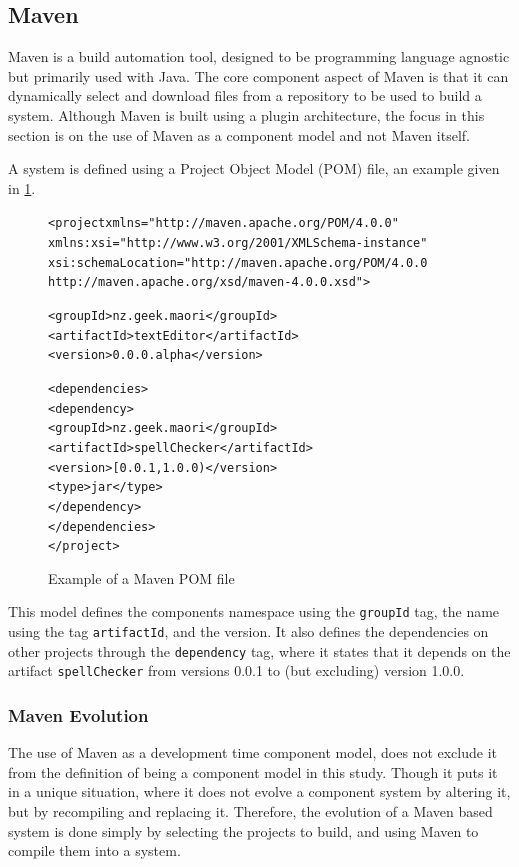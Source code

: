 \subsection{Maven}
Maven is a build automation tool, designed to be programming language agnostic but primarily used with Java.
The core component aspect of Maven is that it can dynamically select and download files from a repository to be used to build a system.
Although Maven is built using a plugin architecture, the focus in this section is on the use of Maven as a component model and not Maven itself.

A system is defined using a Project Object Model (POM) file, an example given in \ref{mavenmetadata}. 

\begin{figure}[htp]
\begin{center}
\begin{alltt}
<project xmlns="http://maven.apache.org/POM/4.0.0"
  xmlns:xsi="http://www.w3.org/2001/XMLSchema-instance"
  xsi:schemaLocation="http://maven.apache.org/POM/4.0.0
                      http://maven.apache.org/xsd/maven-4.0.0.xsd">

  <groupId>nz.geek.maori</groupId>
  <artifactId>textEditor</artifactId>
  <version>0.0.0.alpha</version>

  <dependencies>
    <dependency>
      <groupId>nz.geek.maori</groupId>
      <artifactId>spellChecker</artifactId>
      <version>[0.0.1,1.0.0)</version>
      <type>jar</type>
     </dependency>
  </dependencies>
</project>
\end{alltt}
  \caption[Maven POM file]{Example of a Maven POM file}
  \label{mavenmetadata}
\end{center}
\end{figure}

This model defines the components namespace using the \verb+groupId+ tag, the name using the tag \verb+artifactId+, and the version.
It also defines the dependencies on other projects through the \verb+dependency+ tag,
where it states that it depends on the artifact \verb+spellChecker+ from versions 0.0.1 to (but excluding) version 1.0.0.

\subsubsection{Maven Evolution}
The use of Maven as a development time component model, does not exclude it from the definition of being a component model in this study.
Though it puts it in a unique situation, where it does not evolve a component system by altering it, but by recompiling and replacing it.
Therefore, the evolution of a Maven based system is done simply by selecting the projects to build, and using Maven to compile them into a system. 


